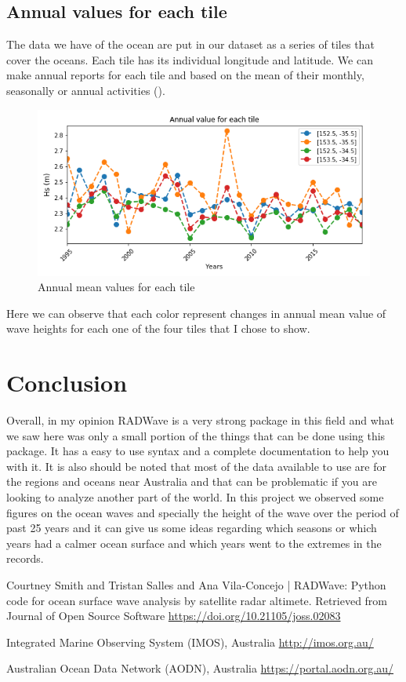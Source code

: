 \documentclass[12pt]{article}
\begin{document}
\newpage

\subsection{Annual values for each tile}
The data we have of the ocean are put in our dataset as a series of tiles that cover the oceans. Each tile has its individual longitude and latitude. We can make annual reports for each tile and based on the mean of their monthly, seasonally or annual activities (). 

\begin{figure}[h]
    \centering
    \includegraphics[width=12 cm]{annual_value.png}
    \caption{Annual mean values for each tile}
    \label{fig:fig7}
\end{figure}
 Here we can observe that each color represent changes in annual mean value of wave heights for each one of the four tiles that I chose to show.
 
\section{Conclusion}
Overall, in my opinion RADWave is a very strong package in this field and what we saw here was only a small portion of the  things that can be done using this package. It has a easy to use syntax and a complete documentation to help you with it. It is also should be noted that most of the data available to use are for the regions and oceans near Australia and that can be problematic if you are looking to analyze another part of the world. 
\newline In this project we observed some figures on the ocean waves and specially the height of the wave over the period of past 25 years and it can give us some ideas regarding which seasons or which years had a calmer ocean surface and which years went to the extremes in the records.
\newpage

\begin{thebibliography}{9}

    Courtney Smith and Tristan Salles and Ana Vila-Concejo | RADWave: Python code for ocean surface wave analysis by     satellite radar altimete. Retrieved from Journal of Open Source Software 
    {\url{https://doi.org/10.21105/joss.02083}}
   
	Integrated Marine Observing System (IMOS), Australia
	{\url{http://imos.org.au/}}
	

	Australian Ocean Data Network (AODN), Australia
	{\url{https://portal.aodn.org.au/}}


\end{thebibliography}
\end{document}
